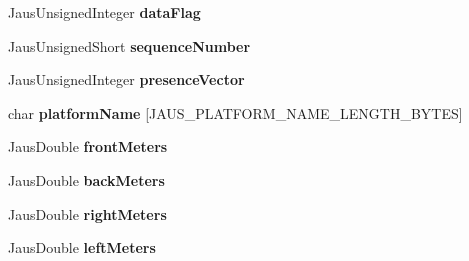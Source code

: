 \begin{DoxyCompactItemize}
\item 
\hypertarget{struct_report_platform_specifications_message_struct_a6c7f106aa018df17aa3f35f5d8ae0efb}{\-Jaus\-Unsigned\-Integer {\bfseries data\-Flag}}\label{struct_report_platform_specifications_message_struct_a6c7f106aa018df17aa3f35f5d8ae0efb}

\item 
\hypertarget{struct_report_platform_specifications_message_struct_abe02ed40619ea5595943f999ca06d7a5}{\-Jaus\-Unsigned\-Short {\bfseries sequence\-Number}}\label{struct_report_platform_specifications_message_struct_abe02ed40619ea5595943f999ca06d7a5}

\item 
\hypertarget{struct_report_platform_specifications_message_struct_a3c8865ee3e4b62dd018c4f3581b87049}{\-Jaus\-Unsigned\-Integer {\bfseries presence\-Vector}}\label{struct_report_platform_specifications_message_struct_a3c8865ee3e4b62dd018c4f3581b87049}

\item 
\hypertarget{struct_report_platform_specifications_message_struct_ad189888ab4d708d5dba91fee312d0b5c}{char {\bfseries platform\-Name} \mbox{[}\-J\-A\-U\-S\-\_\-\-P\-L\-A\-T\-F\-O\-R\-M\-\_\-\-N\-A\-M\-E\-\_\-\-L\-E\-N\-G\-T\-H\-\_\-\-B\-Y\-T\-E\-S\mbox{]}}\label{struct_report_platform_specifications_message_struct_ad189888ab4d708d5dba91fee312d0b5c}

\item 
\hypertarget{struct_report_platform_specifications_message_struct_a1f06d6eebcaf1b4e817aa74c5545150f}{\-Jaus\-Double {\bfseries front\-Meters}}\label{struct_report_platform_specifications_message_struct_a1f06d6eebcaf1b4e817aa74c5545150f}

\item 
\hypertarget{struct_report_platform_specifications_message_struct_a15959a46b511152fd3b841ac82b8d816}{\-Jaus\-Double {\bfseries back\-Meters}}\label{struct_report_platform_specifications_message_struct_a15959a46b511152fd3b841ac82b8d816}

\item 
\hypertarget{struct_report_platform_specifications_message_struct_a916fd4abcfc14e6a85799ae08af99533}{\-Jaus\-Double {\bfseries right\-Meters}}\label{struct_report_platform_specifications_message_struct_a916fd4abcfc14e6a85799ae08af99533}

\item 
\hypertarget{struct_report_platform_specifications_message_struct_a2fe7277c8af7054f5018e03c2e9d9d69}{\-Jaus\-Double {\bfseries left\-Meters}}\label{struct_report_platform_specifications_message_struct_a2fe7277c8af7054f5018e03c2e9d9d69}


\end{DoxyCompactItemize}
